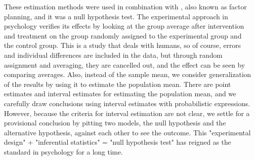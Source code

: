 \documentclass{ltjsbook}
\begin{document}
These estimation methods were used in combination with , also known as factor planning, and it was a null hypothesis test. The experimental approach in psychology verifies its effects by looking at the group average after intervention and treatment on the group randomly assigned to the experimental group and the control group. This is a study that deals with humans, so of course, errors and individual differences are included in the data, but through random assignment and averaging, they are cancelled out, and the effect can be seen by comparing averages. Also, instead of the sample mean, we consider generalization of the results by using it to estimate the population mean. There are point estimates and interval estimates for estimating the population mean, and we carefully draw conclusions using interval estimates with probabilistic expressions. However, because the criteria for interval estimation are not clear, we settle for a provisional conclusion by pitting two models, the null hypothesis and the alternative hypothesis, against each other to see the outcome. This "experimental design" + "inferential statistics" = "null hypothesis test" has reigned as the standard in psychology for a long time.
\end{document}
